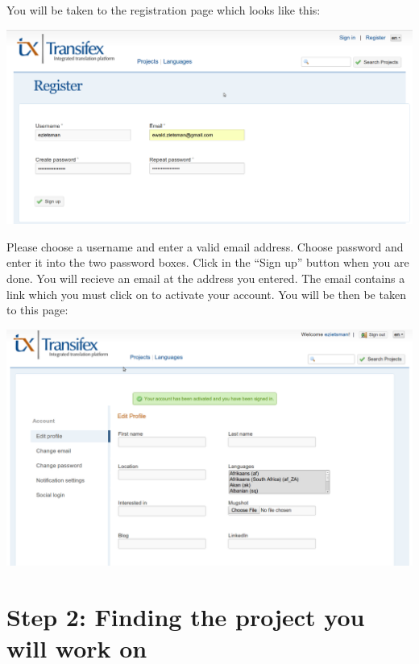 \documentclass[10pt, a4paper]{article}
\begin{document}
You will be taken to the registration page which looks like this:
\begin{center}
    \centerline{\includegraphics[width=\textwidth]{images/enterdetails.png}}
\end{center}
Please choose a username and enter a valid email address. Choose password and enter it into the two password boxes. Click in the ``Sign up'' button when you are done. You will recieve an email at the address you entered. The email contains a link which you must click on to activate your account. You will be then be taken to this page:
\begin{center}
    \centerline{\includegraphics[width=\textwidth]{images/signedin.png}}
\end{center}



\section*{Step 2: Finding the project you will work on}
\end{document}
